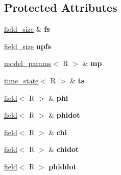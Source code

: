 \subsection*{Protected Attributes}
\begin{DoxyCompactItemize}
\item 
\hypertarget{classverlet_a8132944cb5e2f0262405f6dd524ec744}{
\hyperlink{structfield__size}{field\_\-size} \& {\bfseries fs}}
\label{classverlet_a8132944cb5e2f0262405f6dd524ec744}

\item 
\hypertarget{classverlet_ab18846ba3ae3b1ab168bade6a1ee9d7f}{
\hyperlink{structfield__size}{field\_\-size} {\bfseries upfs}}
\label{classverlet_ab18846ba3ae3b1ab168bade6a1ee9d7f}

\item 
\hypertarget{classverlet_ade18671af39b471461764f03005fa40a}{
\hyperlink{structmodel__params}{model\_\-params}$<$ R $>$ \& {\bfseries mp}}
\label{classverlet_ade18671af39b471461764f03005fa40a}

\item 
\hypertarget{classverlet_ad63e006c557e397ca7bcdd3f1e03557d}{
\hyperlink{structtime__state}{time\_\-state}$<$ R $>$ \& {\bfseries ts}}
\label{classverlet_ad63e006c557e397ca7bcdd3f1e03557d}

\item 
\hypertarget{classverlet_a5a3951561b39cdaa34f8dd4edf67b615}{
\hyperlink{classfield}{field}$<$ R $>$ \& {\bfseries phi}}
\label{classverlet_a5a3951561b39cdaa34f8dd4edf67b615}

\item 
\hypertarget{classverlet_ac1e282cafe2b4fdf5c7236b4cf563a68}{
\hyperlink{classfield}{field}$<$ R $>$ \& {\bfseries phidot}}
\label{classverlet_ac1e282cafe2b4fdf5c7236b4cf563a68}

\item 
\hypertarget{classverlet_a343a04d465d21ccded427b547127ac39}{
\hyperlink{classfield}{field}$<$ R $>$ \& {\bfseries chi}}
\label{classverlet_a343a04d465d21ccded427b547127ac39}

\item 
\hypertarget{classverlet_a47fcf63465cf28937dbf891fcda013b4}{
\hyperlink{classfield}{field}$<$ R $>$ \& {\bfseries chidot}}
\label{classverlet_a47fcf63465cf28937dbf891fcda013b4}

\item 
\hypertarget{classverlet_a2edeaea57fd000dbff25afef8b9669b7}{
\hyperlink{classfield}{field}$<$ R $>$ {\bfseries phiddot}}
\label{classverlet_a2edeaea57fd000dbff25afef8b9669b7}


\end{DoxyCompactItemize}
